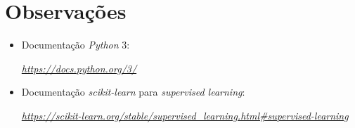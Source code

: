 \documentclass[a4paper]{report}
\begin{document}
\appendix
\chapter{Observações} \label{ch:Observations}
\begin{itemize}
    \item Documentação \textit{Python} 3:
    \par \textit{\url{https://docs.python.org/3/}}

	\item Documentação \textit{scikit-learn} para \textit{supervised learning}:
	\par \textit{\url{https://scikit-learn.org/stable/supervised_learning.html#supervised-learning}}
\end{itemize}
\end{document}
